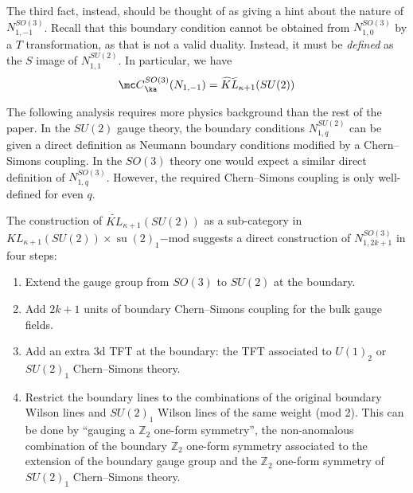 \documentclass[11pt,reqno]{amsart}
\theoremstyle{plain}
\numberwithin{equation}{section}
\DeclareMathOperator{\tsu}{su}
\theoremstyle{definition}
\begin{document}
The third fact, instead, should be thought of as giving a hint about the nature of 
$N_{1,-1}^{SO(3)}$. Recall that this boundary condition cannot be obtained from 
$N_{1,0}^{SO(3)}$ by a $T$ transformation, as that is not a valid duality. 
Instead, it must be {\it defined} as the $S$ image of $N_{1,1}^{SU(2)}$. 
In particular, we have 
\begin{equation}
{\mc C}^{SO(3)}_\ka(N_{1,-1}) = \widetilde{KL}_{\kappa+1}(SU(2))
\end{equation}

The following analysis requires more physics background than the rest
of the paper. In the $SU(2)$ gauge theory, the boundary conditions
$N^{SU(2)}_{1,q}$ can be given a direct definition as Neumann boundary
conditions modified by a Chern--Simons coupling.  In the $SO(3)$ theory
one would expect a similar direct definition of $N^{SO(3)}_{1,q}$.
However, the required Chern--Simons coupling is only well-defined for
even $q$.

The construction of $\widetilde{KL}_{\kappa+1}(SU(2))$ as a sub-category in 
$KL_{\kappa+1}(SU(2)) \times \tsu(2)_1\mathrm {-mod}$ suggests a direct 
construction of $N^{SO(3)}_{1,2k+1}$ in four steps: 

\medskip

\begin{enumerate}
\item Extend the gauge group from $SO(3)$ to $SU(2)$ at the boundary. 

\medskip

\item Add $2k+1$ units of boundary Chern--Simons coupling for the bulk gauge fields. 
\medskip

\item Add an extra 3d TFT at the boundary: the TFT associated to $U(1)_2$ or 
$SU(2)_1$ Chern--Simons theory. 

\medskip

\item Restrict the boundary lines to the combinations of the original boundary Wilson lines 
and $SU(2)_1$ Wilson lines of the same weight (mod 2). This can be done by ``gauging a 
${\mathbb Z}_2$ one-form symmetry'', the non-anomalous combination of the 
boundary ${\mathbb Z}_2$ one-form symmetry associated to the 
extension of the boundary gauge group and the ${\mathbb Z}_2$ one-form symmetry
of $SU(2)_1$ Chern--Simons theory. 
\end{enumerate}

\medskip
\end{document}
